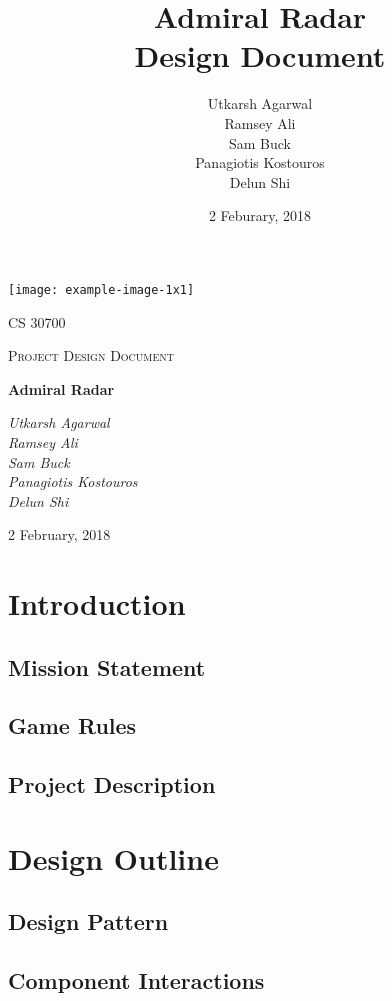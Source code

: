 \documentclass[12pt]{article}
\title{ Admiral Radar \\ \large Design Document}
\author{Utkarsh Agarwal\\ Ramsey Ali \\ Sam Buck \\ Panagiotis Kostouros \\ Delun Shi }
\date{2 Feburary, 2018}
\begin{document}
\begin{titlepage}
	\centering
	\texttt{[image: example-image-1x1]}\par\vspace{1cm}
	{\scshape\LARGE CS 30700 \par}
	{\scshape\Large Project Design Document\par}
	\vspace{1.5cm}
	{\Huge\bfseries Admiral Radar\par}
	\vspace{2cm}
	{\Large\itshape Utkarsh Agarwal\\ Ramsey Ali \\ Sam Buck \\ Panagiotis Kostouros \\ Delun Shi \par}

	\vfill
	{\large 2 February, 2018 \par}
\end{titlepage}

\tableofcontents

\section{Introduction}

\subsection{Mission Statement}

\subsection{Game Rules}

\subsection{Project Description}



\section{Design Outline}

\subsection{Design Pattern}

\subsection{Component Interactions}
\end{document}
